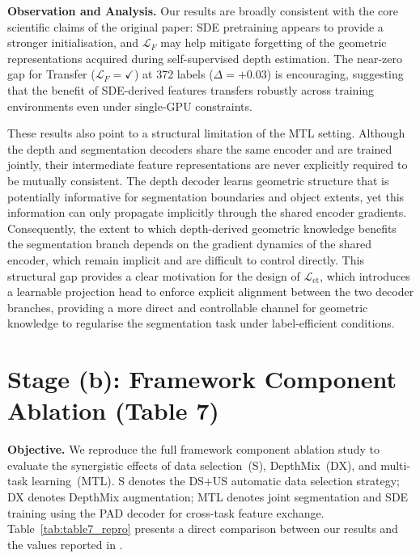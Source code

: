 \noindent
\textbf{Observation and Analysis.}
Our results are broadly consistent with the core scientific claims of the
original paper: SDE pretraining appears to provide a stronger
initialisation, and $\mathcal{L}_F$ may help mitigate forgetting of the
geometric representations acquired during self-supervised depth
estimation. The near-zero gap for Transfer ($\mathcal{L}_F=\checkmark$)
at 372 labels ($\Delta = +0.03$) is encouraging, suggesting that the
benefit of SDE-derived features transfers robustly across training
environments even under single-GPU constraints.

These results also point to a structural limitation of the MTL setting.
Although the depth and segmentation decoders share the same encoder and
are trained jointly, their intermediate feature representations are never
explicitly required to be mutually consistent. The depth decoder learns
geometric structure that is potentially informative for segmentation
boundaries and object extents, yet this information can only propagate
implicitly through the shared encoder gradients. Consequently, the extent
to which depth-derived geometric knowledge benefits the segmentation
branch depends on the gradient dynamics of the shared encoder, which
remain implicit and are difficult to control directly. This structural
gap provides a clear motivation for the design of
$\mathcal{L}_\text{ct}$, which introduces a learnable projection head to
enforce explicit alignment between the two decoder branches, providing a
more direct and controllable channel for geometric knowledge to
regularise the segmentation task under label-efficient conditions.

\section{Stage (b): Framework Component Ablation (Table 7)}
\label{sec:stage_b_table7}

\noindent
\textbf{Objective.} We reproduce the full framework component ablation
study to evaluate the synergistic effects of data selection~(S),
DepthMix~(DX), and multi-task learning~(MTL). S denotes the DS+US
automatic data selection strategy; DX denotes DepthMix augmentation; MTL
denotes joint segmentation and SDE training using the PAD decoder for
cross-task feature exchange. Table~\ref{tab:table7_repro} presents a
direct comparison between our results and the values reported in
\cite{hoyer2023improving}.

